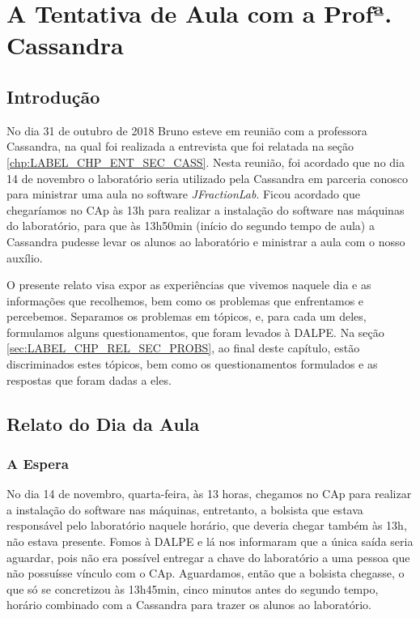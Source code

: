 \chapter{A Tentativa de Aula com a Profª. Cassandra}\label{chp:LABEL_CHP_REL}

\section{Introdução}\label{sec:LABEL_CHP_REL_SEC_INTRO}

No dia 31 de outubro de 2018 Bruno esteve em reunião com a professora Cassandra, na qual foi realizada a entrevista que foi relatada na seção \ref{chp:LABEL_CHP_ENT_SEC_CASS}. Nesta reunião, foi acordado que no dia 14 de novembro o laboratório seria utilizado pela Cassandra em parceria conosco para ministrar uma aula no software \textit{JFractionLab}. Ficou acordado que chegaríamos no CAp às 13h para realizar a instalação do software nas máquinas do laboratório, para que às 13h50min (início do segundo tempo de aula) a Cassandra pudesse levar os alunos ao laboratório e ministrar a aula com o nosso auxílio.

O presente relato visa expor as experiências que vivemos naquele dia e as informações que recolhemos, bem como os problemas que enfrentamos e percebemos. Separamos os problemas em tópicos, e, para cada um deles, formulamos alguns questionamentos, que foram levados à DALPE. Na seção \ref{sec:LABEL_CHP_REL_SEC_PROBS}, ao final deste capítulo, estão discriminados estes tópicos, bem como os questionamentos formulados e as respostas que foram dadas a eles.

\section{Relato do Dia da Aula}\label{sec:LABEL_CHP_REL_SEC_REL}

\subsection{A Espera}\label{sec:LABEL_CHP_REL_SEC_REL_SUBSEC_ESP}

No dia 14 de novembro, quarta-feira, às 13 horas, chegamos no CAp para realizar a instalação do software nas máquinas, entretanto, a bolsista que estava responsável pelo laboratório naquele horário, que deveria chegar também às 13h, não estava presente. Fomos à DALPE e lá nos informaram que a única saída seria aguardar, pois não era possível entregar a chave do laboratório a uma pessoa que não possuísse vínculo com o CAp. Aguardamos, então que a bolsista chegasse, o que só se concretizou às 13h45min, cinco minutos antes do segundo tempo, horário combinado com a Cassandra para trazer os alunos ao laboratório.

